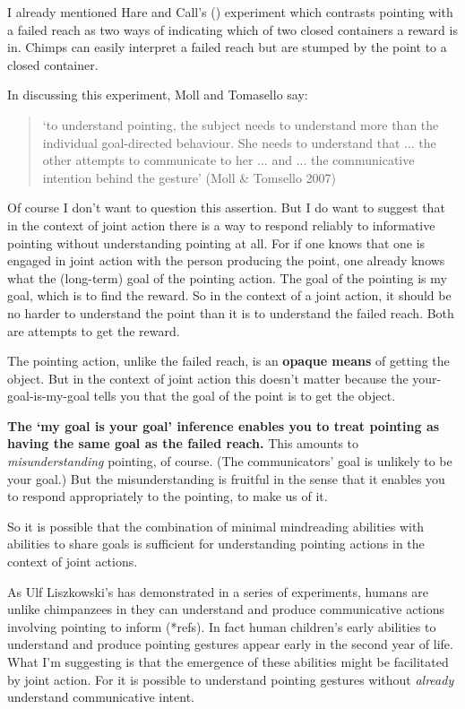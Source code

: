 \documentclass[12pt,a4paper]{extarticle}
\begin{document}
I already mentioned Hare and Call's (\citeyear{hare_chimpanzees_2004}) experiment which contrasts pointing with a failed reach as two ways of indicating which of two closed containers a reward is in.  
Chimps can easily interpret a failed reach but are stumped by the point to a closed container.

In discussing this experiment, Moll and Tomasello say:
%
\begin{quote}
`to understand pointing, the subject needs to understand more than the individual goal-directed behaviour. She needs to understand that ... the other attempts to communicate to her ...  and ... the communicative intention behind the gesture'
(Moll \& Tomsello 2007)
\end{quote}
%
Of course I don't want to question this assertion.
But I do want to suggest that in the context of joint action there is a way to respond reliably to informative pointing without understanding pointing at all.
For if one knows that one is engaged in joint action with the person producing the point, one already knows what the (long-term) goal of the pointing action.  
The goal of the pointing is my goal, which is to find the reward.
So in the context of a joint action, it should be no harder to understand the point than it is to understand the failed reach.
Both are attempts to get the reward.

The pointing action, unlike the failed reach, is an \textbf{opaque means} of getting the object.  But in the context of joint action this doesn't matter because the your-goal-is-my-goal tells you that the goal of the point is to get the object.

\textbf{The `my goal is your goal' inference enables you to treat pointing as having the same goal as the failed reach.}
This amounts to \emph{misunderstanding} pointing, of course.  
(The communicators' goal is unlikely to be your goal.)
But the misunderstanding is fruitful in the sense that it enables you to respond appropriately to the pointing, to make us of it.

So it is possible that the combination of minimal mindreading abilities with abilities to share goals is sufficient for understanding pointing actions in the context of joint actions.

As Ulf Liszkowski's has demonstrated in a series of experiments, humans are unlike chimpanzees in they can understand and produce communicative actions involving pointing to inform (*refs).
In fact human children's early abilities to understand and produce pointing gestures appear early in the second year of life.
What I'm suggesting is that the emergence of these abilities might be facilitated by joint action.
For it is possible to understand pointing gestures without \emph{already} understand communicative intent.
\end{document}
